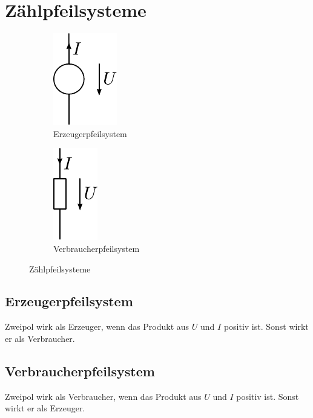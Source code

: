 



\section{Zählpfeilsysteme}

\begin{figure}[h!]
	\centering
	\begin{subfigure}[b]{0.4\textwidth}
		\centering
		\includegraphics[scale=\schscale]{../fig/erzpfeilsys_sch.pdf}
		\caption{Erzeugerpfeilsystem}
		\label{sch:erzpfeilsys}
	\end{subfigure}
	\begin{subfigure}[b]{0.4\textwidth}
		\centering
		\includegraphics[scale=\schscale]{../fig/verbpfeilsys_sch.pdf}
		\caption{Verbraucherpfeilsystem}
		\label{sch:verbpfeilsys}
	\end{subfigure}
	\caption{Zählpfeilsysteme}
	\label{sch:pfeilsys}
\end{figure}

\subsection{Erzeugerpfeilsystem}
Zweipol wirk als Erzeuger, wenn das Produkt aus $U$ und $I$ positiv ist. Sonst wirkt er als Verbraucher. 

\subsection{Verbraucherpfeilsystem}
Zweipol wirk als Verbraucher, wenn das Produkt aus $U$ und $I$ positiv ist. Sonst wirkt er als Erzeuger. 
